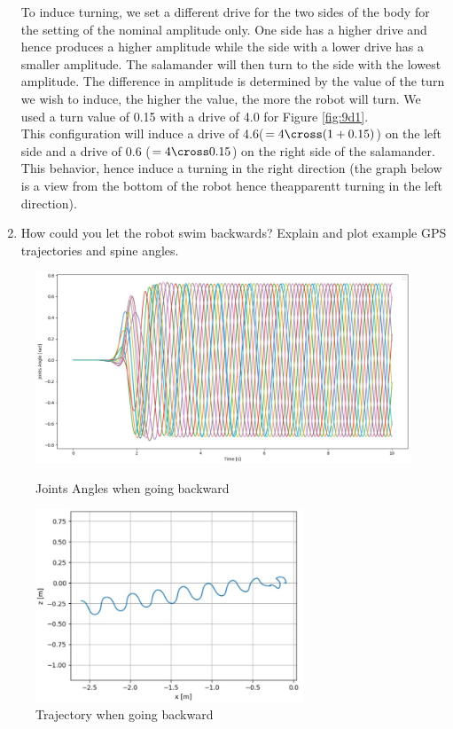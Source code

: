\documentclass{cmc}
\begin{document}
\begin{enumerate}
\hspace{6mm}
To induce turning, we set a different drive for the two sides of the body for the setting of the nominal amplitude only. One side has a higher drive and hence produces a higher amplitude while the side with a lower drive has a smaller amplitude.  The salamander will then turn to the side with the lowest amplitude. The difference in amplitude is determined by the value of the turn we wish to induce, the higher the value, the more the robot will turn. We used a turn value of 0.15 with a drive of 4.0 for Figure \ref{fig:9d1}.\\
This configuration will induce a drive of 4.6($= 4\cross(1+0.15)$) on the left side and a drive of 0.6 ($= 4\cross0.15$) on the right side of the salamander. This behavior, hence induce a turning in the right direction (the graph below is a view from the bottom of the robot hence theapparentt turning in the left direction). 
  
  
\item How could you let the robot swim backwards? Explain and plot
  example GPS trajectories and spine angles.
\end{enumerate}

\begin{figure}[H]
\centering
\includegraphics[width=16cm]{9d2_pos.JPG}
\caption{Joints Angles when going backward}
\centering
\includegraphics[width=8cm]{9d2_traj.JPG}
\caption{Trajectory when going backward}


\label{fig:9d2}
\end{figure}
\end{document}
